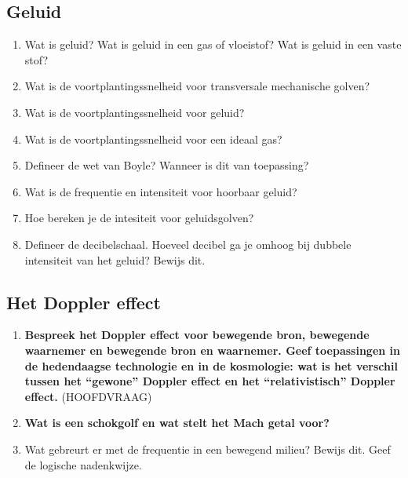 \documentclass[12pt]{article}
\begin{document}
    \subsection{Geluid}
    \begin{enumerate}
        \item Wat is geluid? Wat is geluid in een gas of vloeistof? Wat is geluid in een vaste stof?
        \item Wat is de voortplantingssnelheid voor transversale mechanische golven?
        \item Wat is de voortplantingssnelheid voor geluid?
        \item Wat is de voortplantingssnelheid voor een ideaal gas?
        \item Defineer de wet van Boyle? Wanneer is dit van toepassing?
        \item Wat is de frequentie en intensiteit voor hoorbaar geluid?
        \item Hoe bereken je de intesiteit voor geluidsgolven?
        \item Defineer de decibelschaal. Hoeveel decibel ga je omhoog bij dubbele intensiteit van het geluid? Bewijs dit.
    \end{enumerate}
    \subsection{Het Doppler effect}
    \begin{enumerate}
        \item \textbf{Bespreek het Doppler effect voor bewegende bron, bewegende waarnemer en bewegende bron en waarnemer. Geef toepassingen in de hedendaagse technologie en in de kosmologie: wat is het verschil tussen het “gewone” Doppler effect en het “relativistisch” Doppler effect.} (HOOFDVRAAG)
        \item \textbf{Wat is een schokgolf en wat stelt het Mach getal voor?}
        \item Wat gebreurt er met de frequentie in een bewegend milieu? Bewijs dit. Geef de logische nadenkwijze.
    \end{enumerate}
    
\end{document}
